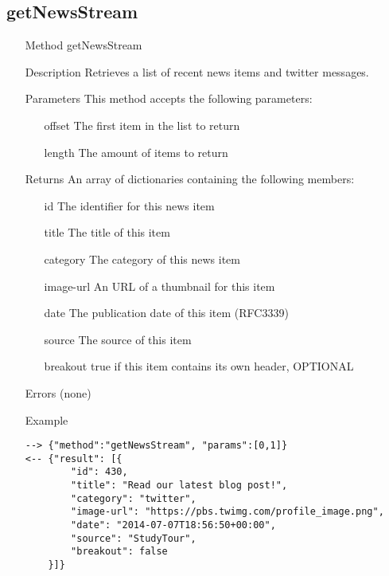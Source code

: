 \documentclass[a4paper]{scrreprt}
\begin{document}
\subsection{getNewsStream}
\begin{enumerate}
\item[Method] getNewsStream
\item[Description] Retrieves a list of recent news items and twitter messages.
\item[Parameters] This method accepts the following parameters:
	\begin{enumerate}
		\item[offset] The first item in the list to return
    	\item[length] The amount of items to return
    \end{enumerate}
\item[Returns] An array of dictionaries containing the following members:
\begin{enumerate}
    \item[id] The identifier for this news item
    \item[title] The title of this item
	\item[category] The category of this news item
    \item[image-url] An URL of a thumbnail for this item
    \item[date] The publication date of this item (RFC3339)
    \item[source] The source of this item
    \item[breakout] true if this item contains its own header, OPTIONAL
	\end{enumerate}
\item[Errors] (none)
\item[Example]
\begin{lstlisting}
--> {"method":"getNewsStream", "params":[0,1]}
<-- {"result": [{
        "id": 430,
        "title": "Read our latest blog post!", 
        "category": "twitter",
        "image-url": "https://pbs.twimg.com/profile_image.png",
        "date": "2014-07-07T18:56:50+00:00", 
        "source": "StudyTour", 
        "breakout": false 
    }]}
\end{lstlisting}
\end{enumerate}

\clearpage
\end{document}

